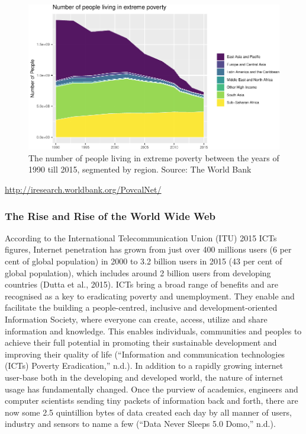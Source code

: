 \documentclass[11pt,]{article}
\begin{document}
\begin{figure}[H]

{\centering \includegraphics{MD_Final_files/figure-latex/globalPovertyPlot-1} 

}

\caption{The number of people living in extreme poverty between the years of 1990 till 2015, segmented by region. Source: The World Bank}\label{fig:globalPovertyPlot}
\end{figure}

\url{http://iresearch.worldbank.org/PovcalNet/}

\hypertarget{the-rise-and-rise-of-the-world-wide-web}{%
\subsubsection{The Rise and Rise of the World Wide
Web}\label{the-rise-and-rise-of-the-world-wide-web}}

According to the International Telecommunication Union (ITU) 2015 ICTs
figures, Internet penetration has grown from just over 400 millions
users (6 per cent of global population) in 2000 to 3.2 billion users in
2015 (43 per cent of global population), which includes around 2 billion
users from developing countries (Dutta et al., 2015). ICTs bring a broad
range of benefits and are recognised as a key to eradicating poverty and
unemployment. They enable and facilitate the building a people-centred,
inclusive and development-oriented Information Society, where everyone
can create, access, utilize and share information and knowledge. This
enables individuals, communities and peoples to achieve their full
potential in promoting their sustainable development and improving their
quality of life (``Information and communication technologies (ICTs)
\textbar{} Poverty Eradication,'' n.d.). In addition to a rapidly
growing internet user-base both in the developing and developed world,
the nature of internet usage has fundamentally changed. Once the purview
of academics, engineers and computer scientists sending tiny packets of
information back and forth, there are now some 2.5 quintillion bytes of
data created each day by all manner of users, industry and sensors to
name a few (``Data Never Sleeps 5.0 \textbar{} Domo,'' n.d.).
\end{document}
